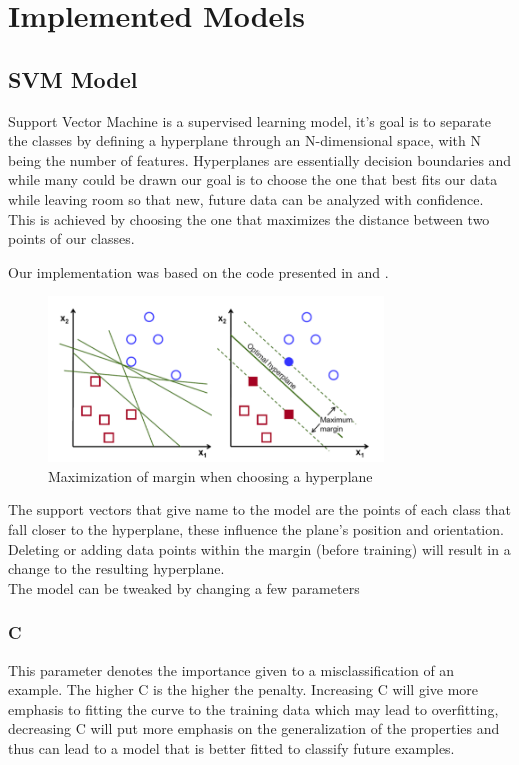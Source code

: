 \documentclass[conference]{IEEEtran}
\begin{document}
\section{Implemented Models}

\subsection{SVM Model}
Support Vector Machine is a supervised learning model, it's goal is to separate the classes by defining a hyperplane through an N-dimensional space, with N being the number of features. Hyperplanes are essentially decision boundaries and while many could be drawn our goal is to choose the one that best fits our data while leaving room so that new, future data can be analyzed with confidence. This is achieved by choosing the one that maximizes the distance between two points of our classes.

Our implementation was based on the code presented in \cite{b10} and \cite{b11}.

\begin{figure}[H]
    \centering
    \includegraphics[width=3.5in]{SVM_margin.png}
    \caption{Maximization of margin when choosing a hyperplane}\label{fig:fig3}
\end{figure}

The support vectors that give name to the model are the points of each class that fall closer to the hyperplane, these influence the plane's position and orientation. Deleting or adding data points within the margin (before training) will result in a change to the resulting hyperplane.\\
The model can be tweaked by changing a few parameters\\

\subsubsection{C}

This parameter denotes the importance given to a misclassification of an example. The higher C is the higher the penalty. Increasing C will give more emphasis to fitting the curve to the training data which may lead to overfitting, decreasing C will put more emphasis on the generalization of the properties and thus can lead to a model that is better fitted to classify future examples.\\
\end{document}
